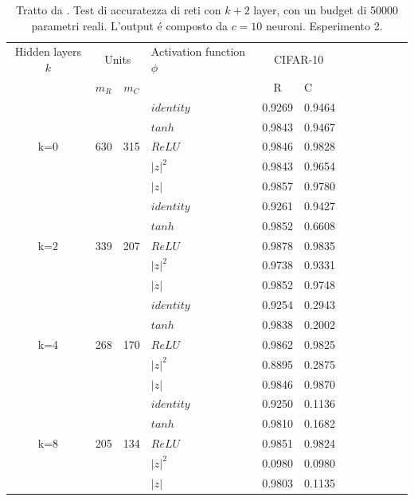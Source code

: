 \documentclass[a4paper,12pt]{report}
\begin{document}
 \begin{table}
  \centering
  \begin{tabular}{cp{} cp{} cp{}   cp{} cp{} cp{}}
   \cline{1-6}
   Hidden layers $k$ & \multicolumn{2}{c}{Units} $p_R$ & Activation function $\phi$ & \multicolumn{2}{c}{CIFAR-10}\\
   \cline{2-3} \cline{5-6}
   & $m_R$ & $m_C$ & & R & C \\
   \cline{1-6}
   & & & $identity$ & 0.9269 & 0.9464 \\
   \cline{4-6}
   & & & $tanh$ & 0.9843 & 0.9467 \\
   \cline{4-6}
   k=0 & 630 & 315 & $ReLU$ & 0.9846 & 0.9828 \\
   \cline{4-6}
   & & & $|z|^2$ & 0.9843 & 0.9654 \\
   \cline{4-6}
   & & & $|z|$ & 0.9857 & 0.9780 \\
   \cline{1-6}
   
   \cline{1-6}
   & & & $identity$ & 0.9261 & 0.9427 \\
   \cline{4-6}
   & & & $tanh$ & 0.9852 & 0.6608 \\
   \cline{4-6}
   k=2 & 339 & 207 & $ReLU$ & 0.9878 & 0.9835 \\
   \cline{4-6}
   & & & $|z|^2$ & 0.9738 & 0.9331 \\
   \cline{4-6}
   & & & $|z|$ & 0.9852 & 0.9748 \\
   \cline{1-6}
   
   \cline{1-6}
   & & & $identity$ & 0.9254 & 0.2943 \\
   \cline{4-6}
   & & & $tanh$ & 0.9838 & 0.2002 \\
   \cline{4-6}
   k=4 & 268 & 170 & $ReLU$ & 0.9862 & 0.9825 \\
   \cline{4-6}
   & & & $|z|^2$ & 0.8895 & 0.2875 \\
   \cline{4-6}
   & & & $|z|$ & 0.9846 & 0.9870 \\
   \cline{1-6}
   
   \cline{1-6}
   & & & $identity$ & 0.9250 & 0.1136 \\
   \cline{4-6}
   & & & $tanh$ & 0.9810 & 0.1682 \\
   \cline{4-6}
   k=8 & 205 & 134 & $ReLU$ & 0.9851 & 0.9824 \\
   \cline{4-6}
   & & & $|z|^2$ & 0.0980 & 0.0980 \\
   \cline{4-6}
   & & & $|z|$ & 0.9803 & 0.1135 \\
   \cline{1-6}
      
  \end{tabular}
  \caption{Tratto da \cite{monning2018evaluation}. Test di accuratezza di reti con $k+2$ layer, con un budget di 50000 parametri reali. L'output \'e composto da $c=10$ neuroni. Esperimento 2.}
  \label{CIFAR-102Tab}
 \end{table}
 
\end{document}
